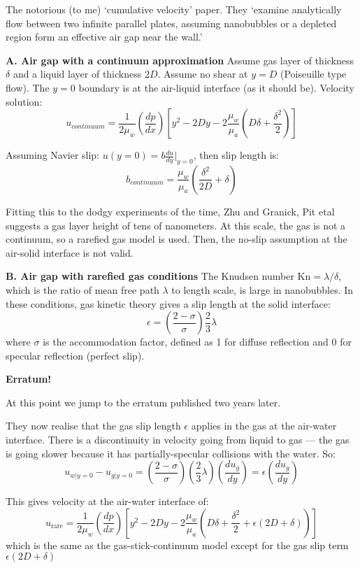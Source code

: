 \documentclass{article}
\begin{document}
The notorious (to me) `cumulative velocity' paper.
They `examine analytically flow between two infinite parallel plates, assuming nanobubbles or a depleted region form an effective air gap near the wall.'

\textbf{A. Air gap with a continuum approximation}
Assume gas layer of thickness $\delta$ and a liquid layer of thickness $2D$. Assume no shear at $y=D$ (Poiseuille type flow). The $y=0$ boundary is at the air-liquid interface (as it should be). Velocity solution:
\[ u_{continuum} = \frac{1}{2\mu_{w}} \left( \frac{dp}{dx} \right) \left[
y^{2} - 2Dy - 2 \frac{\mu_{w}}{\mu_{a}}
\left( D \delta + \frac{\delta^{2}}{2} \right)  \right] \]

Assuming Navier slip: $u(y=0) = b \frac{du}{dy}|_{y=0}$, then slip length is:
\[ b_{continuum} =  \frac{\mu_{w}}{\mu_{a}} \left( \frac{\delta^{2}}{2D} + \delta \right)  \]

Fitting this to the dodgy experiments of the time, Zhu and Granick, Pit etal suggests a gas layer height of tens of nanometers.  At this scale, the gas is not a continuum, so a rarefied gas model is used.  Then, the no-slip assumption at the air-solid interface is not valid.

\textbf{B. Air gap with rarefied gas conditions}
The Knudsen number Kn$= \lambda/\delta$, which is the ratio of mean free path $\lambda$ to length scale, is large in nanobubbles.  In these conditions, gas kinetic theory gives a slip length at the solid interface:
\[ \epsilon = \left( \frac{2 - \sigma}{\sigma} \right) \frac{2}{3} \lambda \]
where $\sigma$ is the accommodation factor, defined as 1 for diffuse reflection and 0 for specular reflection (perfect slip).

\textbf{Erratum!}

At this point we jump to the erratum published two years later.

They now realise that the gas slip length $\epsilon$ applies in the gas at the air-water interface.  There is a discontinuity in velocity going from liquid to gas --- the gas is going slower because it has partially-specular collisions with the water.
So:
\[ u_{w|y=0}-u_{g|y=0} = \left( \frac{2 - \sigma}{\sigma} \right)
 \left( \frac{2}{3} \lambda \right) \left( \frac{du_{g}}{dy} \right)
  = \epsilon \left( \frac{du_{g}}{dy} \right) \]

This gives velocity at the air-water interface of:
\[ u_{\mathrm{rare}} = \frac{1}{2\mu_{w}} \left( \frac{dp}{dx} \right)
 \left[
y^{2} - 2Dy - 2 \frac{\mu_{w}}{\mu_{a}} 
\left( D \delta + \frac{\delta^{2}}{2} + \epsilon ( 2D + \delta)  \right)
\right] \]
which is the same as the gas-stick-continuum model except for the gas slip term $\epsilon (2D + \delta)$
\end{document}
